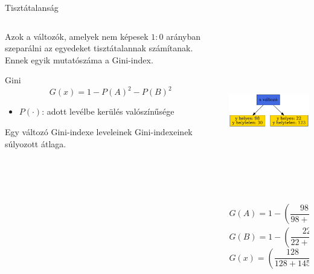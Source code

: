 \documentclass[english, aspectratio=169]{beamer}
\makeatletter
\let\origtableofcontents=\tableofcontents
\def\tableofcontents{\@ifnextchar[{\origtableofcontents}{\gobbletableofcontents}}
\def\gobbletableofcontents#1{\origtableofcontents}
\makeatother
\begin{document}
\begin{frame}
\tableofcontents[currentsection]
\end{frame}

\begin{frame}{Tisztátalanság}
\begin{columns}
\begin{column}{.4\textwidth}
Azok a változók, amelyek nem képesek $1:0$ arányban szeparálni az egyedeket tisztátalannak számítanak. Ennek egyik mutatószáma a Gini-index.
\begin{block}{Gini}
\vspace{-.2cm}
\[
G\left( x \right) = 1 - P\left(A\right)^2 - P\left(B\right)^2 
\]
\vspace{-.5cm}
\begin{itemize}
	\item $P\left(\cdot\right)$: adott levélbe kerülés valószínűsége
\end{itemize}
Egy változó Gini-indexe leveleinek Gini-indexeinek súlyozott átlaga.
\end{block}
\end{column}
\begin{column}{.6\textwidth}
\begin{center}
\includegraphics[width=7cm, height=7cm, keepaspectratio]{graphs/decision_trees_5.png}
\end{center}
\[
G\left(A\right) = 1 - \left(\frac{98}{98 + 30}\right)^2 - \left(\frac{30}{98 + 30}\right)^2 = 0.35
\]
\[
G\left(B\right) = 1 - \left(\frac{22}{22 + 123}\right)^2 - \left(\frac{123}{22 + 123}\right)^2 = 0.25
\]
\[
G\left(x\right) = \left( \frac{128}{128 + 145} \right) \cdot 0.35 \left( \frac{145}{128 + 145} \right) \cdot 0.25 = 0.3
\]
\end{column}
\end{columns}
\end{frame}
\end{document}
